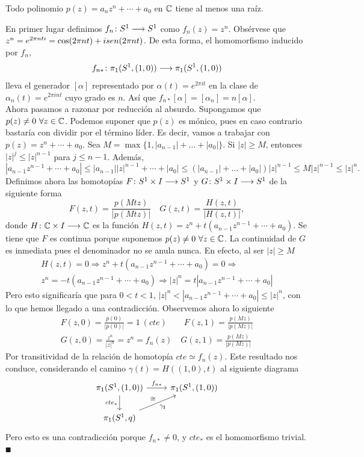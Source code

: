 \documentclass[GTS.tex]{subfiles}
\begin{document}
\newpage 

\begin{teorema}
Todo polinomio $p(z)=a_n z^n+\cdots +a_0$ en $\mathbb{C}$ tiene al menos una raíz.
\end{teorema}
\begin{dem}
En primer lugar definimos $f_n\colon{S^1}\longrightarrow{S^1}$ como $f_n(z)=z^n$. Obsérvese que $z^n=e^{2\pi nti}=\cos(2\pi nt)+isen (2\pi nt)$. De esta forma, el homomorfismo inducido por $f_n$,
\[
f_{n*}\colon{\pi_1(S^1,(1,0))}\longrightarrow{\pi_1(S^1,(1,0))}\\
\]
lleva el generador $[\alpha]$ representado por $\alpha(t)=e^{2\pi it}$ en la clase de $\alpha_n(t)=e^{2\pi i nt}$ cuyo grado es $n$. Así que $f_{n*}[\alpha]=[\alpha_n]=n[\alpha]$.\\
Ahora pasamos a razonar por reducción al absurdo. Supongamos que $p(z)\neq 0\ \forall z\in\C$. Podemos suponer que $p(z)$ es mónico, pues en caso contrario bastaría con dividir por el término líder. Es decir, vamos a trabajar con $p(z)=z^n+\cdots + a_0$. Sea $M=\max\{1,|a_{n-1}|+\dots +|a_0|\}$. Si $|z|\geq M$, entonces $|z|^j\leq |z|^{n-1}$ para $j\leq n-1$. Además,
\[
|a_{n-1}z^{n-1}+\cdots +a_0|\leq |a_{n-1}||z|^{n-1}+\cdots +|a_0|\leq (|a_{n-1}|+\dots +|a_0|)|z|^{n-1}\leq M|z|^{n-1}\leq|z|^n.
\]
Definimos ahora las homotopías $F\colon{S^1\times I}\longrightarrow{S^1}$ y $G\colon{S^1\times I}\longrightarrow{S^1}$ de la siguiente forma
\[
F(z,t)=\frac{p(Mtz)}{|p(Mtz)|}\quad G(z,t)=\frac{H(z,t)}{|H(z,t)|},
\]
donde $H\colon{\mathbb{C}\times I}\longrightarrow{\mathbb{C}}$ es la función $H(z,t)=z^n+t(a_{n-1}z^{n-1}+\cdots +a_0)$. Se tiene que $F$ es continua porque suponemos $p(z)\neq 0\ \forall z\in\C$. La continuidad de $G$ es inmediata pues el denominador no se anula nunca. En efecto, al ser $|z|\geq M$
\begin{gather*}
H(z,t)=0\Rightarrow z^n+t(a_{n-1}z^{n-1}+\cdots +a_0)=0\Rightarrow \\
z^n=-t(a_{n-1}z^{n-1}+\cdots +a_0)\Rightarrow |z|^n=t|a_{n-1}z^{n-1}+\cdots +a_0|
\end{gather*}
Pero esto significaría que para $0<t<1$, $|z|^n<|a_{n-1}z^{n-1}+\cdots +a_0|\leq|z|^n$, con lo que hemos llegado a una contradicción. Observemos ahora lo siguiente
\begin{gather*}
F(z,0)=\frac{p(0)}{|p(0)|}=1\ (cte)\qquad F(z,1)=\frac{p(Mz)}{|p(Mz)|}\\
G(z,0)=\frac{z^n}{|z|^n}=z^n=f_n(z)\quad G(z,1)=\frac{p(Mz)}{|p(Mz)|}
\end{gather*}
Por transitividad de la relación de homotopía $cte\simeq f_n(z)$. Este resultado nos conduce, considerando el camino $\gamma(t)=H((1,0),t)$ al siguiente diagrama
\[
\begin{tikzcd}
\pi_1(S^1,(1,0)) \ar[r, "f_{n*} "]\arrow[d,"cte_* "'] & \pi_1(S^1,(1,0))\\
\pi_1(S^1,q)\arrow[ur,"\gamma_\sharp "',"\cong"]
\end{tikzcd}
\]
Pero esto es una contradicción porque $f_{n*}\neq 0$, y $cte_*$ es el homomorfismo trivial. $\QED$
\end{dem}
\end{document}
